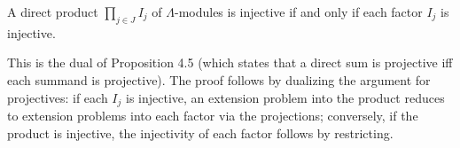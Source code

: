 A direct product $\prod_{j \in J} I_j$ of $\Lambda$-modules is injective if and only if each factor $I_j$ is injective.

This is the dual of Proposition 4.5 (which states that a direct sum is projective iff each summand is projective). The proof follows by dualizing the argument for projectives: if each $I_j$ is injective, an extension problem into the product reduces to extension problems into each factor via the projections; conversely, if the product is injective, the injectivity of each factor follows by restricting.
